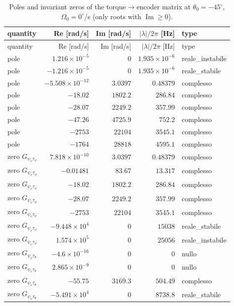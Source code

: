 \documentclass[10pt,a4paper]{article}
\numberwithin{equation}{section}
\begin{document}
\begin{longtable}{lrrrl}
\caption{Poles and invariant zeros of the torque$\to$encoder matrix at $\theta_0 = -45^\circ$, $\Omega_0 = 0^\circ$/s (only roots with $\operatorname{Im} \ge 0$).}\label{tab:polezero}\\
\toprule quantity & Re [rad/s] & Im [rad/s] & $|\lambda|/2\pi$ [Hz] & type \\ \midrule\endfirsthead
\toprule quantity & Re [rad/s] & Im [rad/s] & $|\lambda|/2\pi$ [Hz] & type \\ \midrule\endhead
pole & $1.216\times10^{-5}$ & $0$ & $1.935\times10^{-6}$ & reale\_instabile \\
pole & $-1.216\times10^{-5}$ & $0$ & $1.935\times10^{-6}$ & reale\_stabile \\
pole & $-5.508\times10^{-12}$ & $3.0397$ & $0.48379$ & complesso \\
pole & $-18.02$ & $1802.2$ & $286.84$ & complesso \\
pole & $-28.07$ & $2249.2$ & $357.99$ & complesso \\
pole & $-47.26$ & $4725.9$ & $752.2$ & complesso \\
pole & $-2753$ & $22104$ & $3545.1$ & complesso \\
pole & $-1764$ & $28818$ & $4595.1$ & complesso \\
\midrule
zero $G_{\psi_e\tau_\psi}$ & $7.818\times10^{-10}$ & $3.0397$ & $0.48379$ & complesso \\
zero $G_{\psi_e\tau_\psi}$ & $-0.01481$ & $83.67$ & $13.317$ & complesso \\
zero $G_{\psi_e\tau_\psi}$ & $-18.02$ & $1802.2$ & $286.84$ & complesso \\
zero $G_{\psi_e\tau_\psi}$ & $-28.07$ & $2249.2$ & $357.99$ & complesso \\
zero $G_{\psi_e\tau_\psi}$ & $-2753$ & $22104$ & $3545.1$ & complesso \\
zero $G_{\psi_e\tau_\psi}$ & $-9.448\times10^{4}$ & $0$ & $15038$ & reale\_stabile \\
zero $G_{\psi_e\tau_\psi}$ & $1.574\times10^{5}$ & $0$ & $25056$ & reale\_instabile \\
\midrule
zero $G_{\psi_e\tau_\theta}$ & $-4.6\times10^{-16}$ & $0$ & $0$ & nullo \\
zero $G_{\psi_e\tau_\theta}$ & $2.865\times10^{-9}$ & $0$ & $0$ & nullo \\
zero $G_{\psi_e\tau_\theta}$ & $-55.75$ & $3169.3$ & $504.49$ & complesso \\
zero $G_{\psi_e\tau_\theta}$ & $-5.491\times10^{4}$ & $0$ & $8738.8$ & reale\_stabile \\

\end{longtable}
\end{document}
